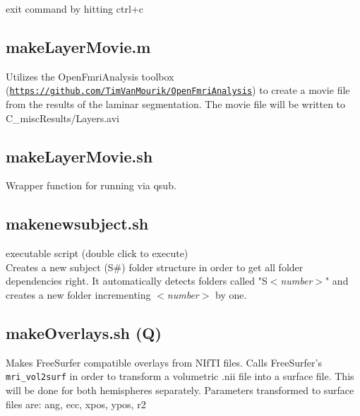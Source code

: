 \documentclass[12pt,a4paper]{scrartcl}
\begin{document}
\noindent exit command by hitting ctrl+c\\

\subsection{makeLayerMovie.m}
\label{m:makeMov}
Utilizes the OpenFmriAnalysis toolbox (\href{https://github.com/TimVanMourik/OpenFmriAnalysis}{\nolinkurl{https://github.com/TimVanMourik/OpenFmriAnalysis}}) to create a movie file from the results of the laminar segmentation. The movie file will be written to C\_miscResults/Layers.avi\\

\subsection{makeLayerMovie.sh}
\label{sh:makeMov}
Wrapper function for running \texttt{} via qsub.\\

\subsection{makenewsubject.sh}
\label{sh:newS}
executable script (double click to execute)\\

Creates a new subject (S\#) folder structure in order to get all folder dependencies right. It automatically detects folders called "S\textit{$<$number$>$}" and creates a new folder incrementing \textit{$<$number$>$} by one.\\

\subsection{makeOverlays.sh (Q)}
\label{sh:mkOver}
Makes FreeSurfer compatible overlays from NIfTI files. Calls FreeSurfer's \texttt{mri\_vol2surf} in order to transform a volumetric .nii file into a surface file. This will be done for both hemispheres separately. Parameters transformed to surface files are: ang, ecc, xpos, ypos, r2\\
\end{document}
